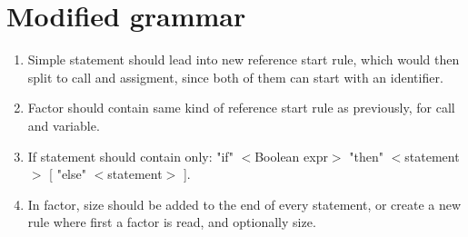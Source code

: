 \documentclass[english]{article}
\begin{document}
\section{Modified grammar}
\begin{enumerate}
\item Simple statement should lead into new reference start rule, which would then split to call and assigment, since both of them can start with an identifier.
\item Factor should contain same kind of reference start rule as previously, for call and variable.
\item If statement should contain only: "if" $<$Boolean expr$>$ "then" $<$statement$>$ [ "else" $<$statement$>$ ].
\item In factor, size should be added to the end of every statement, or create a new rule where first a factor is read, and optionally size.
\end{enumerate}
\end{document}

